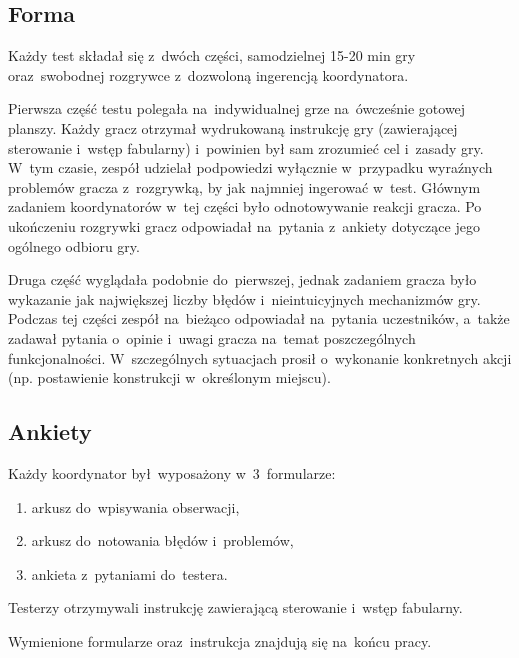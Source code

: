 \documentclass[licencjacka]{pracamgr}
\begin{document}
    \subsection{Forma}
      Każdy test składał  się z~dwóch części, samodzielnej 15-20 min gry
      oraz~swobodnej rozgrywce z~dozwoloną ingerencją koordynatora.

      Pierwsza część testu polegała na~indywidualnej grze na~ówcześnie gotowej planszy.
      Każdy gracz otrzymał wydrukowaną instrukcję gry (zawierającej sterowanie i~wstęp fabularny)
      i~powinien był sam zrozumieć cel i~zasady gry. W~tym czasie, zespół udzielał podpowiedzi
      wyłącznie w~przypadku wyraźnych problemów gracza z~rozgrywką, by jak najmniej ingerować w~test.
      Głównym zadaniem koordynatorów w~tej części było odnotowywanie reakcji gracza.
      Po ukończeniu rozgrywki gracz odpowiadał na~pytania z~ankiety dotyczące jego ogólnego odbioru gry.

      Druga część wyglądała podobnie do~pierwszej, jednak zadaniem gracza było wykazanie
      jak największej liczby błędów i~nieintuicyjnych mechanizmów gry.
      Podczas tej części zespół na~bieżąco odpowiadał na~pytania uczestników,
      a~także zadawał pytania o~opinie i~uwagi gracza na~temat poszczególnych funkcjonalności.
      W~szczególnych sytuacjach prosił o~wykonanie konkretnych akcji (np. postawienie konstrukcji w~określonym miejscu).

    \subsection{Ankiety}
      Każdy koordynator był~wyposażony w~3~formularze:
      \begin{enumerate}
	\item arkusz do~wpisywania obserwacji,
	\item arkusz do~notowania błędów i~problemów,
	\item ankieta z~pytaniami do~testera.
      \end{enumerate}
      Testerzy otrzymywali instrukcję zawierającą sterowanie i~wstęp fabularny.

      \noindent
      Wymienione formularze oraz~instrukcja znajdują się na~końcu pracy.
\end{document}
